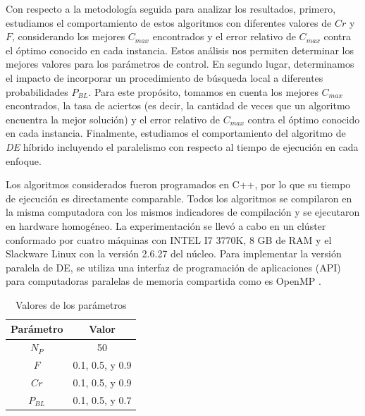 Con respecto a la metodología seguida para analizar los resultados, primero, estudiamos el comportamiento de estos algoritmos con diferentes valores de $ Cr$ y $F$, considerando los mejores $ C_ {max} $ encontrados y el error relativo de $ C_ {max} $ contra el óptimo conocido en cada instancia. Estos análisis nos permiten determinar los mejores valores para los parámetros de control. En segundo lugar, determinamos el impacto de incorporar un procedimiento de búsqueda local a diferentes probabilidades $ P_ {BL} $. Para este propósito, tomamos en cuenta los mejores $ C_ {max} $ encontrados, la tasa de aciertos (es decir, la cantidad de veces que un algoritmo encuentra la mejor solución) y el error relativo de $ C_ {max} $ contra el óptimo conocido en cada instancia. Finalmente, estudiamos el comportamiento del algoritmo de \textit{DE} híbrido incluyendo el paralelismo con respecto al tiempo de ejecución en cada enfoque.


Los algoritmos considerados fueron programados en C++, por lo que su tiempo de ejecución es directamente comparable. Todos los algoritmos se compilaron en la misma computadora con los mismos indicadores de compilación y se ejecutaron en hardware homogéneo. La experimentación se llevó a cabo en un clúster conformado por cuatro máquinas con INTEL I7 3770K, 8 GB de RAM y el Slackware Linux con la versión 2.6.27 del núcleo. Para implementar la versión paralela de DE, se utiliza una interfaz de programación de aplicaciones (API) para computadoras paralelas de memoria compartida como es OpenMP \cite{openMP}.


\begin{table}[b]
    \scriptsize
\centering
\caption{Valores de los parámetros}
    \begin{tabular}{|c|c|}
    \hline
    \multicolumn{1}{|c|}{\textbf{Parámetro}} & \multicolumn{1}{c|}{\textbf{Valor}} \\ 
    \hline
    $N_P$                              & 50                          \\
    $F$                               & 0.1, 0.5, y 0.9           \\
    $Cr$                              & 0.1, 0.5, y 0.9                 \\
    $P_{BL}$                          & 0.1, 0.5, y 0.7          \\
    \hline
    \end{tabular}
\label{tab:DEparameteres}%
\end{table}



